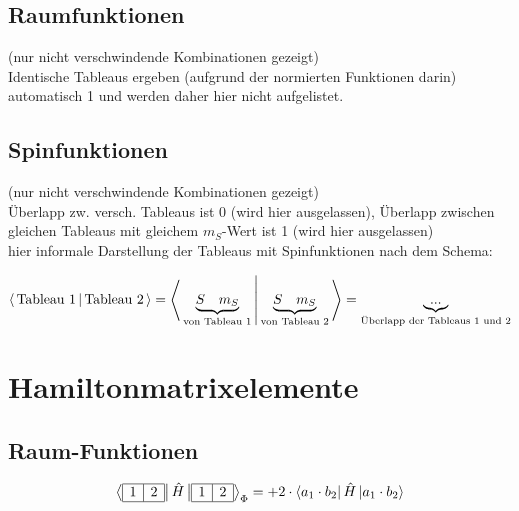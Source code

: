 \documentclass[fleqn]{article}%
\newcommand{\checkpagebreak}{\needspace{.25\textheight}}%
\begin{document}
%
\subsection{Raumfunktionen}%
\label{subsec:Raumfunktionen}%
 (nur nicht verschwindende Kombinationen gezeigt)\\Identische Tableaus ergeben (aufgrund der normierten Funktionen darin) automatisch 1 und werden daher hier nicht aufgelistet.

%
\checkpagebreak%
\subsection{Spinfunktionen}%
\label{subsec:Spinfunktionen}%
(nur nicht verschwindende Kombinationen gezeigt)\\ Überlapp zw. versch. Tableaus ist 0 (wird hier ausgelassen), Überlapp zwischen gleichen Tableaus mit gleichem $m_S$-Wert ist 1 (wird hier ausgelassen)\\hier informale Darstellung der Tableaus mit Spinfunktionen nach dem Schema: 

%
\begin{dmath*}\bra{\,\text{Tableau 1}\,}\ket{\,\text{Tableau 2}\,} = \bra{\, \underbrace{S \quad m_S}_{\text{von Tableau 1}} \,} \ket{\, \underbrace{S \quad m_S}_{\text{von Tableau 2}} \,} = \underbrace{...}_{\text{Überlapp der Tableaus 1 und 2}}\end{dmath*}%
\vspace{0.25cm}%
\vspace{0.25cm}%
\vspace{0.25cm}%
\newpage%
\section{Hamiltonmatrixelemente}%
\label{sec:Hamiltonmatrixelemente}%

%
\subsection{Raum{-}Funktionen}%
\label{subsec:Raum{-}Funktionen}%

%
\vspace{0.25cm}%
\vspace{0.25cm}%
\begin{dmath*}\bra{\begin{array}{|c|c|} \hline 1 & 2\\ \cline{1-2} \end{array} }\hat{H}\ket{\begin{array}{|c|c|} \hline 1 & 2\\ \cline{1-2} \end{array} }_{\Phi} = + 2  \cdot \bra{ a_{1} \cdot b_{2} } \hat{H} \ket{ a_{1} \cdot b_{2}}\end{dmath*}%
\vspace{0.25cm}%
\checkpagebreak%
\end{document}
